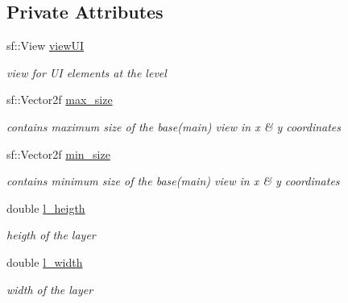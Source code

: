 \subsection*{Private Attributes}
\begin{DoxyCompactItemize}
\item 
\mbox{\label{class_advanced_display_a1d6b163d432d3a1fa01568fbebd5e496}} 
sf\+::\+View \hyperlink{class_advanced_display_a1d6b163d432d3a1fa01568fbebd5e496}{view\+UI}
\begin{DoxyCompactList}\small\item\em view for UI elements at the level \end{DoxyCompactList}\item 
\mbox{\label{class_advanced_display_a77c1ded61c1988f130205e4248f0bd07}} 
sf\+::\+Vector2f \hyperlink{class_advanced_display_a77c1ded61c1988f130205e4248f0bd07}{max\+\_\+size}
\begin{DoxyCompactList}\small\item\em contains maximum size of the base(main) view in x \& y coordinates \end{DoxyCompactList}\item 
\mbox{\label{class_advanced_display_a5a51a04f2b299f784ec96c9438b84a9d}} 
sf\+::\+Vector2f \hyperlink{class_advanced_display_a5a51a04f2b299f784ec96c9438b84a9d}{min\+\_\+size}
\begin{DoxyCompactList}\small\item\em contains minimum size of the base(main) view in x \& y coordinates \end{DoxyCompactList}\item 
\mbox{\label{class_advanced_display_a2107d1ad65c137bdf4fe2ebb64cff29c}} 
double \hyperlink{class_advanced_display_a2107d1ad65c137bdf4fe2ebb64cff29c}{l\+\_\+heigth}
\begin{DoxyCompactList}\small\item\em heigth of the layer \end{DoxyCompactList}\item 
\mbox{\label{class_advanced_display_ae8c55cb678ad26dbbb47b6a837a74886}} 
double \hyperlink{class_advanced_display_ae8c55cb678ad26dbbb47b6a837a74886}{l\+\_\+width}
\begin{DoxyCompactList}\small\item\em width of the layer \end{DoxyCompactList}\end{DoxyCompactItemize}

